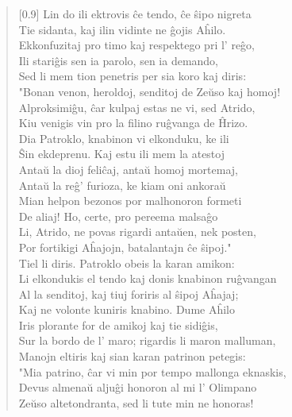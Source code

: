 \begin{verse}[0.9\textwidth]
          Lin do ili ektrovis \^ce tendo, \^ce \^sipo nigreta\\
          Tie sidanta, kaj ilin vidinte ne \^gojis A\^hilo.\\
          Ekkonfuzitaj pro timo kaj respektego pri l' re\^go,\\
          Ili stari\^gis sen ia parolo, sen ia demando,\\
          Sed li mem tion penetris per sia koro kaj diris:\\
          \vin   "Bonan venon, heroldoj, senditoj de Ze\u uso kaj homoj!\\
          Alproksimi\^gu, \^car kulpaj estas ne vi, sed Atrido,\\
          Kiu venigis vin pro la filino ru\^gvanga de \^Hrizo.\\
          Dia Patroklo, knabinon vi elkonduku, ke ili\\
          \^Sin ekdeprenu. Kaj estu ili mem la atestoj\\
          Anta\u u la dioj feli\^caj, anta\u u homoj mortemaj,\\
          Anta\u u la re\^g' furioza, ke kiam oni ankora\u u\\
          Mian helpon bezonos por malhonoron formeti\\
          De aliaj! Ho, certe, pro pereema malsa\^go\\
          Li, Atrido, ne povas rigardi anta\u uen, nek posten,\\
          Por fortikigi A\^hajojn, batalantajn \^ce \^sipoj."\\
          \vin   Tiel li diris. Patroklo obeis la karan amikon:\\
          Li elkondukis el tendo kaj donis knabinon ru\^gvangan\\
          Al la senditoj, kaj tiuj foriris al \^sipoj A\^hajaj;\\
          Kaj ne volonte kuniris knabino. Dume A\^hilo\\
          Iris plorante for de amikoj kaj tie sidi\^gis,\\
          Sur la bordo de l' maro; rigardis li maron malluman,\\
          Manojn eltiris kaj sian karan patrinon petegis:\\
          \vin   "Mia patrino, \^car vi min por tempo mallonga eknaskis,\\
          Devus almena\u u alju\^gi honoron al mi l' Olimpano\\
          Ze\u uso altetondranta, sed li tute min ne honoras!\\

\end{verse}

